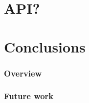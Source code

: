 \documentclass[bsc,frontabs,twoside,singlespacing,parskip,deptreport]{infthesis}     %
\begin{document}
\chapter{API?}

\chapter{Conclusions}

\subsection{Overview}

\subsection{Future work}




\end{document}
